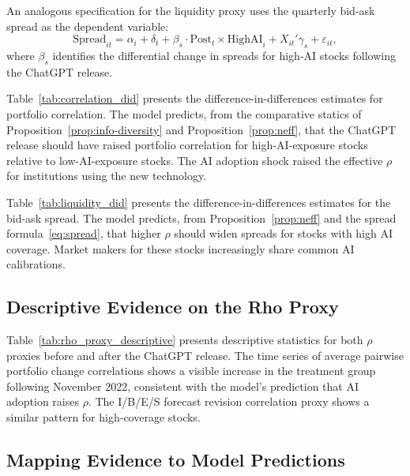 An analogous specification for the liquidity proxy uses the quarterly bid-ask spread as the dependent variable:
\begin{equation}\label{eq:did-liquidity}
  \text{Spread}_{it} = \alpha_i + \delta_t + \beta_s \cdot \text{Post}_t \times \text{HighAI}_i + X_{it}'\gamma_s + \varepsilon_{it},
\end{equation}
where $\beta_s$ identifies the differential change in spreads for high-AI stocks following the ChatGPT release.



Table~\ref{tab:correlation_did} presents the difference-in-differences estimates for portfolio correlation. The model predicts, from the comparative statics of Proposition~\ref{prop:info-diversity} and Proposition~\ref{prop:neff}, that the ChatGPT release should have raised portfolio correlation for high-AI-exposure stocks relative to low-AI-exposure stocks. The AI adoption shock raised the effective $\rho$ for institutions using the new technology.



Table~\ref{tab:liquidity_did} presents the difference-in-differences estimates for the bid-ask spread. The model predicts, from Proposition~\ref{prop:neff} and the spread formula~\eqref{eq:spread}, that higher $\rho$ should widen spreads for stocks with high AI coverage. Market makers for these stocks increasingly share common AI calibrations.

\subsection{Descriptive Evidence on the Rho Proxy}



Table~\ref{tab:rho_proxy_descriptive} presents descriptive statistics for both $\rho$ proxies before and after the ChatGPT release. The time series of average pairwise portfolio change correlations shows a visible increase in the treatment group following November 2022, consistent with the model's prediction that AI adoption raises $\rho$. The I/B/E/S forecast revision correlation proxy shows a similar pattern for high-coverage stocks.

\subsection{Mapping Evidence to Model Predictions}

